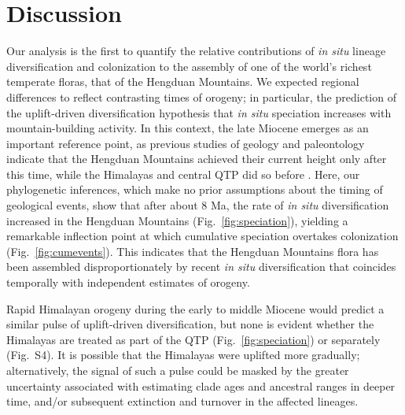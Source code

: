 \documentclass[9pt,twocolumn,twoside,lineno]{pnas-new}
\begin{document}
\section*{Discussion}

Our analysis is the first to quantify the relative contributions of
\textit{in situ} lineage diversification and colonization to the
assembly of one of the world's richest temperate floras, that of the
Hengduan Mountains. We expected regional differences to reflect
contrasting times of orogeny; in particular, the prediction of the
uplift-driven diversification hypothesis that \textit{in situ}
speciation increases with mountain-building activity. In this context,
the late Miocene emerges as an important reference point, as previous
studies of geology and paleontology indicate that the Hengduan
Mountains achieved their current height only after this time, while
the Himalayas and central QTP did so before
\citep{WangY2012,Wang2014,Spicer2003,Favre2015,Renner2016}. Here, our
phylogenetic inferences, which make no prior assumptions about the
timing of geological events, show that after about 8 Ma, the rate of
\textit{in situ} diversification increased in the Hengduan Mountains
(Fig.~\ref{fig:speciation}), yielding a remarkable inflection point at
which cumulative speciation overtakes colonization
(Fig.~\ref{fig:cumevents}). This indicates that the Hengduan Mountains
flora has been assembled disproportionately by recent \textit{in situ}
diversification that coincides temporally with independent estimates
of orogeny.

Rapid Himalayan orogeny during the early to middle Miocene
\citep{searle2011,Spicer2003,Wang2014} would predict a similar pulse
of uplift-driven diversification, but none is evident whether the
Himalayas are treated as part of the QTP (Fig.~\ref{fig:speciation})
or separately (Fig.~S4). It is possible that the Himalayas were
uplifted more gradually; alternatively, the signal of such a pulse
could be masked by the greater uncertainty associated with estimating
clade ages and ancestral ranges in deeper time, and/or subsequent
extinction and turnover in the affected lineages.
\end{document}
